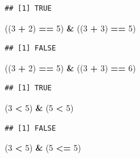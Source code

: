 \documentclass[
]{book}
\newenvironment{Shaded}{\begin{snugshade}}{\end{snugshade}}
\newcommand{\DecValTok}[1]{\textcolor[rgb]{0.00,0.00,0.81}{#1}}
\newcommand{\NormalTok}[1]{#1}
\newcommand{\OperatorTok}[1]{\textcolor[rgb]{0.81,0.36,0.00}{\textbf{#1}}}
\newcommand{\StringTok}[1]{\textcolor[rgb]{0.31,0.60,0.02}{#1}}
\begin{document}
\begin{verbatim}
## [1] TRUE
\end{verbatim}

\begin{Shaded}
\begin{Highlighting}[]
\NormalTok{((}\DecValTok{3} \OperatorTok{+}\StringTok{ }\DecValTok{2}\NormalTok{) }\OperatorTok{==}\StringTok{ }\DecValTok{5}\NormalTok{) }\OperatorTok{&}\StringTok{ }\NormalTok{((}\DecValTok{3} \OperatorTok{+}\StringTok{ }\DecValTok{3}\NormalTok{) }\OperatorTok{==}\StringTok{ }\DecValTok{5}\NormalTok{)}
\end{Highlighting}
\end{Shaded}

\begin{verbatim}
## [1] FALSE
\end{verbatim}

\begin{Shaded}
\begin{Highlighting}[]
\NormalTok{((}\DecValTok{3} \OperatorTok{+}\StringTok{ }\DecValTok{2}\NormalTok{) }\OperatorTok{==}\StringTok{ }\DecValTok{5}\NormalTok{) }\OperatorTok{&}\StringTok{ }\NormalTok{((}\DecValTok{3} \OperatorTok{+}\StringTok{ }\DecValTok{3}\NormalTok{) }\OperatorTok{==}\StringTok{ }\DecValTok{6}\NormalTok{)}
\end{Highlighting}
\end{Shaded}

\begin{verbatim}
## [1] TRUE
\end{verbatim}

\begin{Shaded}
\begin{Highlighting}[]
\NormalTok{(}\DecValTok{3} \OperatorTok{<}\StringTok{ }\DecValTok{5}\NormalTok{) }\OperatorTok{&}\StringTok{ }\NormalTok{(}\DecValTok{5} \OperatorTok{<}\StringTok{ }\DecValTok{5}\NormalTok{)}
\end{Highlighting}
\end{Shaded}

\begin{verbatim}
## [1] FALSE
\end{verbatim}

\begin{Shaded}
\begin{Highlighting}[]
\NormalTok{(}\DecValTok{3} \OperatorTok{<}\StringTok{ }\DecValTok{5}\NormalTok{) }\OperatorTok{&}\StringTok{ }\NormalTok{(}\DecValTok{5} \OperatorTok{<=}\StringTok{ }\DecValTok{5}\NormalTok{)}
\end{Highlighting}
\end{Shaded}
\end{document}
